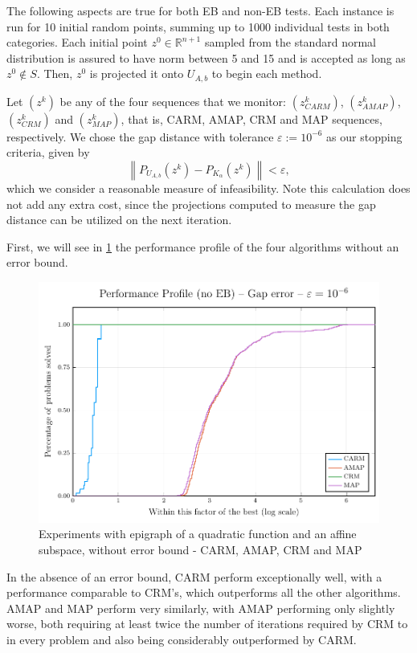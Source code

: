 \documentclass[smallextended,numbook,nospthms]{svjour3}
\theoremstyle{plain}
\theoremstyle{definition}
\def\RR{\mathds R}
\begin{document}
The following aspects are true for both EB and non-EB tests. Each instance is run for 10 initial random points, summing up to 1000 individual tests in both categories. Each initial point $z^{0} \in \RR^{n+1}$ sampled from the standard normal distribution is assured to have norm between 5 and 15 and is accepted as long as $z^{0} \notin S$. Then, $z^{0}$ is projected it onto $U_{A, b}$ to begin each method.

Let $\left(z^{k}\right)$ be any of the four sequences that we monitor: $\left(z_{CARM}^{k}\right)$, $\left(z_{AMAP}^{k}\right)$, $\left(z_{CRM}^{k}\right)$ and $\left(z_{MAP}^{k}\right)$, that is, CARM, AMAP, CRM and MAP sequences, respectively. We chose the gap distance with tolerance $\varepsilon:=10^{-6}$ as our stopping criteria, given by
\[
\left\|P_{U_{A, b}}\left(z^{k}\right)-P_{K_{\alpha}}\left(z^{k}\right)\right\|<\varepsilon,
\]
which we consider a reasonable measure of infeasibility. Note this calculation does not add any extra cost, since the projections computed to measure the gap distance can be utilized on the next iteration.

First, we will see in \cref{fig:perprof no EB 1} the performance profile of the four algorithms without an error bound.
	
\begin{figure}[h!]
	\centering
	\includegraphics[scale=0.8]{fig1}
	\caption{Experiments with epigraph of a quadratic function and an affine subspace, without error bound - CARM, AMAP, CRM and MAP}
	\label{fig:perprof no EB 1}
\end{figure}

In the absence of an error bound, CARM perform exceptionally well, with a performance comparable to CRM's, which outperforms all the other algorithms. AMAP and MAP perform very similarly, with AMAP performing only slightly worse, both requiring at least twice the number of iterations required by CRM to in every problem and also being considerably outperformed by CARM.
\end{document}
